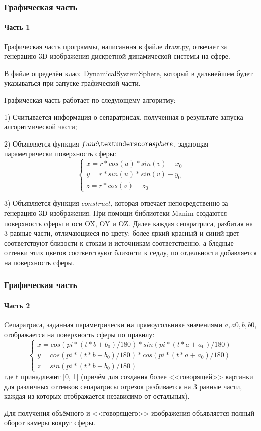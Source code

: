 \documentclass[aspectratio=169]{beamer}
\begin{document}
\begin{frame}
\frametitle{Графическая часть}
\framesubtitle{Часть 1}
	Графическая часть программы, написанная в файле draw.py, отвечает за генерацию 3D-изображения дискретной динамической системы на сфере.
	\par В файле определён класс DynamicalSystemSphere, который в дальнейшем будет указываться при запуске графической части.
	\par Графическая часть работает по следующему алгоритму:
	\par 1) Считывается информация о сепаратрисах, полученная в результате запуска алгоритмической части;
	\par 2) Объявляется функция $func \textunderscore sphere$, задающая параметрически поверхность сферы:
	$$ \begin{cases}
		x = r * cos(u) * sin(v) - x_0\\
		y = r * sin(u) * sin(v) - y_0\\
		z = r * cos(v) - z_0
	\end{cases} $$
	\par 3) Объявляется функция $construct$, которая отвечает непосредственно за генерацию 3D-изображения. При помощи библиотеки Manim создаются поверхность сферы и оси OX, OY и OZ. Далее каждая сепаратриса, разбитая на 3 равные части, отличающиеся по цвету: более яркий красный и синий цвет соответствуют близости к стокам и источникам соответственно, а бледные оттенки этих цветов соответствуют близости к седлу, по отдельности добавляется на поверхность сферы.
\end{frame}
\begin{frame}
	\frametitle{Графическая часть}
	\framesubtitle{Часть 2}
	Cепаратриса, заданная параметрически на прямоугольнике значениями $a, a0, b, b0$, отображается на поверхность сферы по правилу:
	$$ \begin{cases}
		x = cos(pi * (t * b + b_0) / 180) * sin(pi * (t * a + a_0) / 180)\\
		y = cos(pi * (t * b + b_0) / 180) * cos(pi * (t * a + a_0) / 180)\\
		z = sin(pi * (t * b + b_0) / 180)
	\end{cases} $$ где t принадлежит [0, 1] (причём для создания более <<говорящей>> картинки для различных оттенков сепаратрисы отрезок разбивается на 3 равные части, каждая из которых отображается независимо от остальных).
	\par Для получения объёмного и <<говорящего>> изображения объявляется полный оборот камеры вокруг сферы.
\end{frame}
\end{document}
